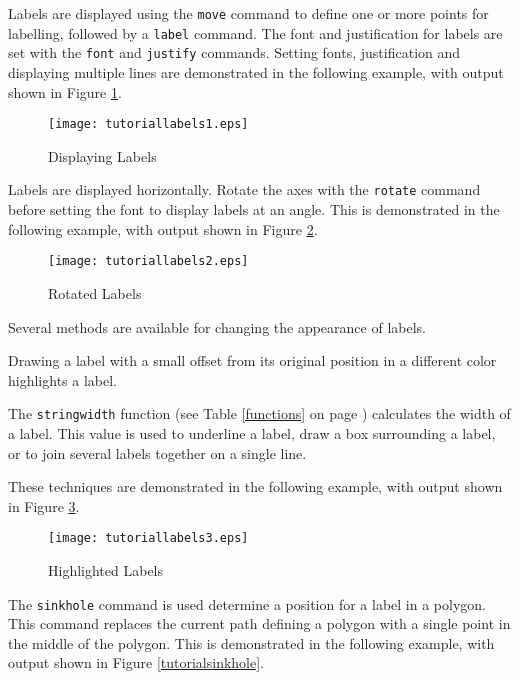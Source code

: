 Labels are displayed using the \texttt{move}
command to define one or more points for labelling, followed by a
\texttt{label} command.  The font and justification for labels
are set with the \texttt{font} and \texttt{justify} commands.
Setting fonts, justification and displaying multiple lines
are demonstrated in the following example, with output
shown in Figure \ref{tutoriallabels1}.



\begin{figure}[htb]
\texttt{[image: tutoriallabels1.eps]}
\caption{Displaying Labels}
\label{tutoriallabels1}
\end{figure}

Labels are displayed horizontally.  Rotate the axes with the \texttt{rotate}
command before setting the font to display labels at an angle.
This is demonstrated in the following example,
with output shown in Figure \ref{tutoriallabels2}.



\begin{figure}[htb]
\texttt{[image: tutoriallabels2.eps]}
\caption{Rotated Labels}
\label{tutoriallabels2}
\end{figure}

Several methods are available for changing the appearance of labels.

Drawing a label with a small offset from its original position in a different
color highlights a label.

The \texttt{stringwidth} function (see Table \ref{functions}
on page \pageref{functions}) calculates the
width of a label.  This value is used to underline a label, draw a box
surrounding a label, or to join several labels together on a single line.

These techniques are demonstrated in the following example,
with output shown in Figure \ref{tutoriallabels3}.



\begin{figure}[htb]
\texttt{[image: tutoriallabels3.eps]}
\caption{Highlighted Labels}
\label{tutoriallabels3}
\end{figure}

The \texttt{sinkhole} command is used determine a position
for a label in a polygon.  This command
replaces the current path defining a polygon with a single point in
the middle of the polygon.  This is demonstrated in the following
example, with output shown in Figure \ref{tutorialsinkhole}.

